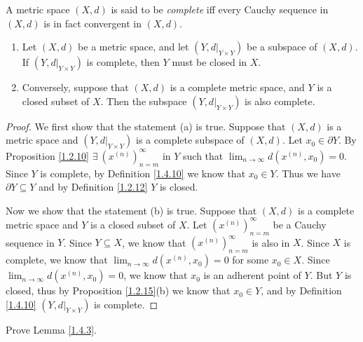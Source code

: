 \begin{definition}\label{1.4.10}
    A metric space \((X, d)\) is said to be \emph{complete} iff every Cauchy sequence in \((X, d)\) is in fact convergent in \((X, d)\).
\end{definition}

\setcounter{theorem}{11}
\begin{proposition}\label{1.4.12}
    \begin{enumerate}
        \item Let \((X, d)\) be a metric space, and let \((Y, d|_{Y \times Y})\) be a subspace of \((X, d)\).
              If \((Y, d|_{Y \times Y})\) is complete, then \(Y\) must be closed in \(X\).
        \item Conversely, suppose that \((X, d)\) is a complete metric space, and \(Y\) is a closed subset of \(X\).
              Then the subspace \((Y, d|_{Y \times Y})\) is also complete.
    \end{enumerate}
\end{proposition}

\begin{proof}
    We first show that the statement (a) is true.
    Suppose that \((X, d)\) is a metric space and \((Y, d|_{Y \times Y})\) is a complete subspace of \((X, d)\).
    Let \(x_0 \in \partial Y\).
    By Proposition \ref{1.2.10} \(\exists\ (x^{(n)})_{n = m}^\infty\) in \(Y\) such that \(\lim_{n \to \infty} d(x^{(n)}, x_0) = 0\).
    Since \(Y\) is complete, by Definition \ref{1.4.10} we know that \(x_0 \in Y\).
    Thus we have \(\partial Y \subseteq Y\) and by Definition \ref{1.2.12} \(Y\) is closed.

    Now we show that the statement (b) is true.
    Suppose that \((X, d)\) is a complete metric space and \(Y\) is a closed subset of \(X\).
    Let \((x^{(n)})_{n = m}^\infty\) be a Cauchy sequence in \(Y\).
    Since \(Y \subseteq X\), we know that \((x^{(n)})_{n = m}^\infty\) is also in \(X\).
    Since \(X\) is complete, we know that \(\lim_{n \to \infty} d(x^{(n)}, x_0) = 0\) for some \(x_0 \in X\).
    Since \(\lim_{n \to \infty} d(x^{(n)}, x_0) = 0\), we know that \(x_0\) is an adherent point of \(Y\).
    But \(Y\) is closed, thus by Proposition \ref{1.2.15}(b) we know that \(x_0 \in Y\), and by Definition \ref{1.4.10} \((Y, d|_{Y \times Y})\) is complete.
\end{proof}

\exercisesection

\begin{exercise}\label{ex 1.4.1}
    Prove Lemma \ref{1.4.3}.
\end{exercise}

